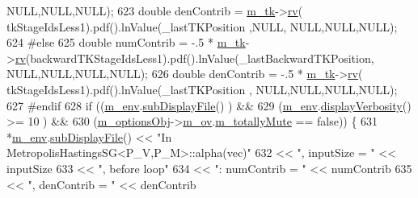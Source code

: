 \begin{DoxyCode}
      NULL,NULL,NULL);
623   \textcolor{keywordtype}{double} denContrib = \hyperlink{class_q_u_e_s_o_1_1_metropolis_hastings_s_g_a26e9680abddfb793486c995fa16f8c2d}{m\_tk}->\hyperlink{class_q_u_e_s_o_1_1_base_t_k_group_a6bd8e0bec0105471aad8801cbf1a0851}{rv}(        tkStageIdsLess1).pdf().lnValue(\_lastTKPosition        ,NULL,
      NULL,NULL,NULL);
624 \textcolor{preprocessor}{#else}
625 \textcolor{preprocessor}{}  \textcolor{keywordtype}{double} numContrib = -.5 * \hyperlink{class_q_u_e_s_o_1_1_metropolis_hastings_s_g_a26e9680abddfb793486c995fa16f8c2d}{m\_tk}->\hyperlink{class_q_u_e_s_o_1_1_base_t_k_group_a6bd8e0bec0105471aad8801cbf1a0851}{rv}(backwardTKStageIdsLess1).pdf().lnValue(\_lastBackwardTKPosition,
      NULL,NULL,NULL,NULL);
626   \textcolor{keywordtype}{double} denContrib = -.5 * \hyperlink{class_q_u_e_s_o_1_1_metropolis_hastings_s_g_a26e9680abddfb793486c995fa16f8c2d}{m\_tk}->\hyperlink{class_q_u_e_s_o_1_1_base_t_k_group_a6bd8e0bec0105471aad8801cbf1a0851}{rv}(        tkStageIdsLess1).pdf().lnValue(\_lastTKPosition        ,
      NULL,NULL,NULL,NULL);
627 \textcolor{preprocessor}{#endif}
628 \textcolor{preprocessor}{}  \textcolor{keywordflow}{if} ((\hyperlink{class_q_u_e_s_o_1_1_metropolis_hastings_s_g_ac8ea061e55b920e0c8f9bce5c3f20e52}{m\_env}.\hyperlink{class_q_u_e_s_o_1_1_base_environment_a8a0064746ae8dddfece4229b9ad374d6}{subDisplayFile}()                   ) &&
629       (\hyperlink{class_q_u_e_s_o_1_1_metropolis_hastings_s_g_ac8ea061e55b920e0c8f9bce5c3f20e52}{m\_env}.\hyperlink{class_q_u_e_s_o_1_1_base_environment_a1fe5f244fc0316a0ab3e37463f108b96}{displayVerbosity}() >= 10           ) &&
630       (\hyperlink{class_q_u_e_s_o_1_1_metropolis_hastings_s_g_a5d0bc9f73d50d272aa6bfb5ef5939ef3}{m\_optionsObj}->\hyperlink{class_q_u_e_s_o_1_1_metropolis_hastings_s_g_options_a9d4792d9fc2dc5439b8ab489b0c236eb}{m\_ov}.\hyperlink{class_q_u_e_s_o_1_1_mh_options_values_af812309e81191e88dfdc87c5815141a3}{m\_totallyMute} == \textcolor{keyword}{false})) \{
631     *\hyperlink{class_q_u_e_s_o_1_1_metropolis_hastings_s_g_ac8ea061e55b920e0c8f9bce5c3f20e52}{m\_env}.\hyperlink{class_q_u_e_s_o_1_1_base_environment_a8a0064746ae8dddfece4229b9ad374d6}{subDisplayFile}() << \textcolor{stringliteral}{"In MetropolisHastingsSG<P\_V,P\_M>::alpha(vec)"}
632                            << \textcolor{stringliteral}{", inputSize = "}  << inputSize
633                            << \textcolor{stringliteral}{", before loop"}
634                            << \textcolor{stringliteral}{": numContrib = "} << numContrib
635                            << \textcolor{stringliteral}{", denContrib = "} << denContrib

\end{DoxyCode}
